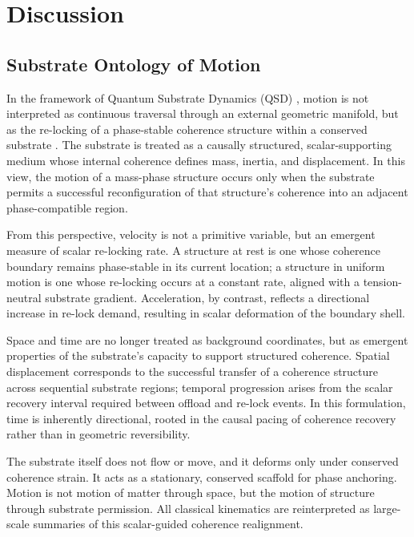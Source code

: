 \documentclass[entropy,article,submit,pdftex,moreauthors]{Definitions/mdpi}
\begin{document}

\section{Discussion}
\subsection{Substrate Ontology of Motion}

In the framework of Quantum Substrate Dynamics (QSD) \cite{bush2025}, motion is not interpreted as continuous traversal through an external geometric manifold, but as the re-locking of a phase-stable coherence structure within a conserved substrate \cite{bush-coherence}. The substrate is treated as a causally structured, scalar-supporting medium whose internal coherence defines mass, inertia, and displacement. In this view, the motion of a mass-phase structure occurs only when the substrate permits a successful reconfiguration of that structure’s coherence into an adjacent phase-compatible region.

From this perspective, velocity is not a primitive variable, but an emergent measure of scalar re-locking rate. A structure at rest is one whose coherence boundary remains phase-stable in its current location; a structure in uniform motion is one whose re-locking occurs at a constant rate, aligned with a tension-neutral substrate gradient. Acceleration, by contrast, reflects a directional increase in re-lock demand, resulting in scalar deformation of the boundary shell.

Space and time are no longer treated as background coordinates, but as emergent properties of the substrate's capacity to support structured coherence. Spatial displacement corresponds to the successful transfer of a coherence structure across sequential substrate regions; temporal progression arises from the scalar recovery interval required between offload and re-lock events. In this formulation, time is inherently directional, rooted in the causal pacing of coherence recovery rather than in geometric reversibility.

The substrate itself does not flow or move, and it deforms only under conserved coherence strain. It acts as a stationary, conserved scaffold for phase anchoring. Motion is not motion of matter through space, but the motion of structure through substrate permission. All classical kinematics are reinterpreted as large-scale summaries of this scalar-guided coherence realignment.
\end{document}
